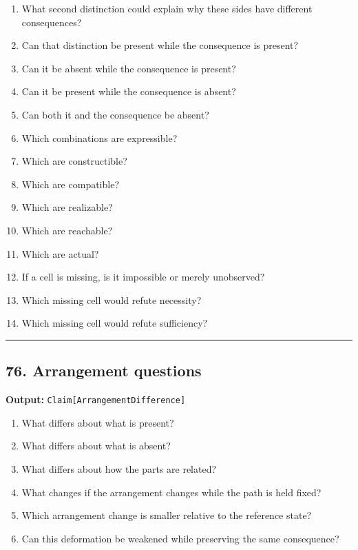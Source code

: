 \documentclass[
]{article}
\providecommand{\tightlist}{%
  \setlength{\itemsep}{0pt}\setlength{\parskip}{0pt}}
\begin{document}
\begin{enumerate}
\def\labelenumi{\arabic{enumi}.}
\tightlist
\item
  What second distinction could explain why these sides have different
  consequences?
\item
  Can that distinction be present while the consequence is present?
\item
  Can it be absent while the consequence is present?
\item
  Can it be present while the consequence is absent?
\item
  Can both it and the consequence be absent?
\item
  Which combinations are expressible?
\item
  Which are constructible?
\item
  Which are compatible?
\item
  Which are realizable?
\item
  Which are reachable?
\item
  Which are actual?
\item
  If a cell is missing, is it impossible or merely unobserved?
\item
  Which missing cell would refute necessity?
\item
  Which missing cell would refute sufficiency?
\end{enumerate}

\begin{center}\rule{0.5\linewidth}{0.5pt}\end{center}

\subsection{76. Arrangement questions}\label{arrangement-questions}

\textbf{Output:} \texttt{Claim{[}ArrangementDifference{]}}

\begin{enumerate}
\def\labelenumi{\arabic{enumi}.}
\tightlist
\item
  What differs about what is present?
\item
  What differs about what is absent?
\item
  What differs about how the parts are related?
\item
  What changes if the arrangement changes while the path is held fixed?
\item
  Which arrangement change is smaller relative to the reference state?
\item
  Can this deformation be weakened while preserving the same
  consequence?
\end{enumerate}
\end{document}

